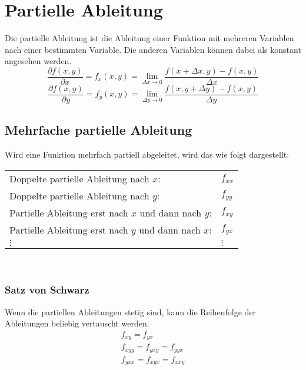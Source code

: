 



\section{Partielle Ableitung}
Die partielle Ableitung ist die Ableitung einer Funktion mit mehreren 
Variablen nach einer bestimmten Variable. Die anderen Variablen können dabei 
als konstant angesehen werden. 
\[ \boxed{\frac{\partial f(x,y)}{\partial x} = f_x(x,y) 
= \lim_{\Delta x \to 0} \frac{f(x + \Delta x, y) - f(x, y)}{\Delta x}} \]
\[ \boxed{\frac{\partial f(x,y)}{\partial y} = f_y(x,y) 
= \lim_{\Delta y \to 0} \frac{f(x, y + \Delta y) - f(x, y)}{\Delta y}} \]

\subsection{Mehrfache partielle Ableitung}
Wird eine Funktion mehrfach partiell abgeleitet, wird das wie folgt 
dargestellt: 
\newline
\begin{tabular}{@{}ll}
Doppelte partielle Ableitung nach $x$:          &$f_{xx}$ \\
Doppelte partielle Ableitung nach $y$:          &$f_{yy}$ \\
Partielle Ableitung erst nach $x$ und dann nach $y$: &$f_{xy}$ \\
Partielle Ableitung erst nach $y$ und dann nach $x$: &$f_{yx}$ \\
$\vdots$ & $\vdots$ 
\end{tabular} \\

\subsubsection{Satz von Schwarz}
Wenn die partiellen Ableitungen stetig sind, kann die Reihenfolge der 
Ableitungen beliebig vertauscht werden. 
\[ \boxed{\begin{array}{l}
f_{xy} = f_{yx} \\
f_{xyy} = f_{yxy} = f_{yyx} \\
f_{yxx} = f_{xyx} = f_{xxy} 
\end{array}} \]

